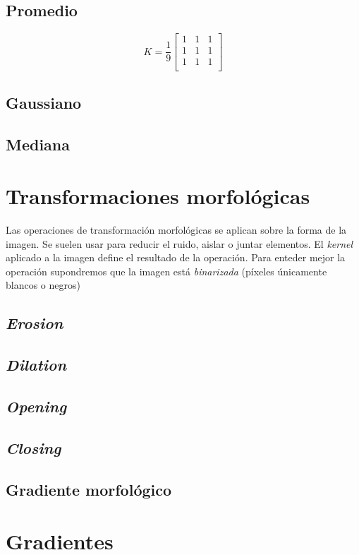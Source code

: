 \subsection{Promedio}
\begin{equation*}
  K = \frac{1}{9}
  \begin{bmatrix}
    1 & 1 & 1 \\
    1 & 1 & 1 \\
    1 & 1 & 1 \\
  \end{bmatrix}
\end{equation*}
\subsection{Gaussiano}
\subsection{Mediana}

\section{Transformaciones morfológicas}
Las operaciones de transformación morfológicas se aplican sobre la
forma de la imagen. Se suelen usar para reducir el ruido, aislar o
juntar elementos. El \emph{kernel} aplicado a la imagen define el
resultado de la operación. Para enteder mejor la operación supondremos
que la imagen está \emph{binarizada} (píxeles únicamente blancos o
negros)
\subsection{\emph{Erosion}}
\subsection{\emph{Dilation}}
\subsection{\emph{Opening}}
\subsection{\emph{Closing}}
\subsection{Gradiente morfológico}

\section{Gradientes}
